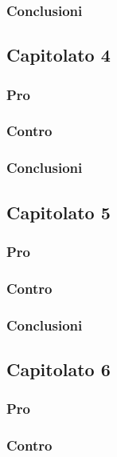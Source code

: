 \subsubsection{Conclusioni}


\subsection{Capitolato 4}

\subsubsection{Pro}

\subsubsection{Contro}

\subsubsection{Conclusioni}


\subsection{Capitolato 5}

\subsubsection{Pro}

\subsubsection{Contro}

\subsubsection{Conclusioni}


\subsection{Capitolato 6}

\subsubsection{Pro}

\subsubsection{Contro}


